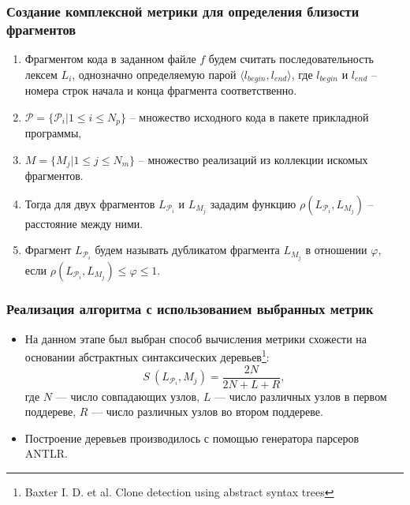 \documentclass{beamer}
\begin{document}
\begin{frame}
\frametitle{Создание комплексной метрики для определения близости фрагментов}
\begin{enumerate}
	\item Фрагментом кода в заданном файле $f$ будем считать последовательность лексем $L_i$, однозначно определяемую парой $\langle l_{begin}, l_{end}\rangle$, где $l_{begin}$ и $l_{end}$ -- номера строк начала и конца фрагмента соответственно.
	
	\item $\mathcal{P} = \{\mathcal{P}_i | 1 \leq i \leq N_p \}$ -- множество  исходного кода в пакете прикладной программы, 
	
	\item $ M = \{M_j | 1 \leq j \leq N_m \}$ -- множество реализаций из коллекции искомых фрагментов.	
	
	\item Тогда для двух фрагментов $L_{\mathcal{P}_i}$ и $L_{M_j}$ зададим функцию $\rho (L_{\mathcal{P}_i}, L_{M_j})$ -- расстояние между ними.
	\item Фрагмент $L_{\mathcal{P}_i}$ будем называть дубликатом фрагмента $L_{M_j}$ в отношении $ \varphi$, если $\rho (L_{\mathcal{P}_i}, L_{M_j}) \leq \varphi \leq 1$.
\end{enumerate}
\end{frame}


\begin{frame}
\frametitle{Реализация алгоритма с использованием выбранных метрик}
\begin{itemize}
	\item На данном этапе был выбран способ вычисления метрики схожести на основании  абстрактных синтаксических деревьев\footnote[1]{Baxter I. D. et al. Clone detection using abstract syntax trees}:
\begin{equation}
S ~ (L_{\mathcal{P}_i}, M_j) = \frac{2 N}{2 N + L + R},
\end{equation}
где $N$ — число совпадающих узлов, $L$ — число различных узлов в первом поддереве, $R$ — число различных узлов во втором поддереве.
	\item Построение деревьев производилось с помощью генератора парсеров ANTLR.
\end{itemize}

\end{frame}
\end{document}
